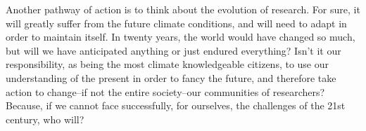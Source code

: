 \vspace{\baselineskip}
Another pathway of action is to think about the evolution of research. For sure, it will greatly suffer from the future climate conditions, and will need to adapt in order to maintain itself.
In twenty years, the world would have changed so much, but will we have anticipated anything or just endured everything?
Isn't it our responsibility, as being the most climate knowledgeable citizens, to use our understanding of the present in order to fancy the future, and therefore take action to change\---if not the entire society\---our communities of researchers?
Because, if we cannot face successfully, for ourselves, the challenges of the 21st century, who will?


